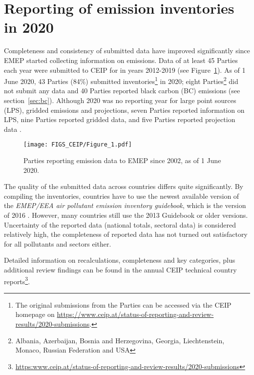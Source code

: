 \section{Reporting of emission inventories in 2020}

Completeness and consistency of submitted data have improved significantly since EMEP started collecting information on emissions. Data of at least 45 Parties each year were submitted to CEIP for in years 2012-2019 (see Figure~\ref{fig:CEIP1}). As of 1 June 2020, 43 Parties (84\%) submitted inventories\footnote{The original submissions from the Parties can be accessed via the CEIP homepage on \url{https://www.ceip.at/status-of-reporting-and-review-results/2020-submissions}.} in 2020; eight Parties\footnote{Albania, Azerbaijan, Bosnia and Herzegovina, Georgia, Liechtenstein, Monaco, Russian Federation and USA} did not submit any data and 40 Parties reported black carbon (BC) emissions (see section~\ref{sec:bc}). Although 2020 was no reporting year for large point sources (LPS), gridded emissions and projections, seven Parties reported information on LPS, nine Parties reported gridded data, and five Parties reported projection data \citep{CEIP2020}.

\begin{figure}[h]
\centering
{\texttt{[image: FIGS\_CEIP/Figure\_1.pdf]}}
\caption{Parties reporting emission data to EMEP since 2002, as of 1 June 2020.}
\label{fig:CEIP1}
\end{figure}

The quality of the submitted data across countries differs quite significantly. By compiling the inventories, countries have to use the newest available version of the {\it EMEP/EEA air pollutant emission inventory guidebook}, which is the version of 2016 \citep{EmisInvGuide2016}. However, many countries still use the 2013 Guidebook \citep{EmisInvGuide2013} or older versions. Uncertainty of the reported data (national totals, sectoral data) is considered relatively high, the completeness of reported data has not turned out satisfactory for all pollutants and sectors either.

Detailed information on recalculations, completeness and key
categories, plus additional review findings can be found in the annual
CEIP technical country  reports{\footnote{\url{https:www.ceip.at/status-of-reporting-and-review-results/2020-submissions}}}. 

